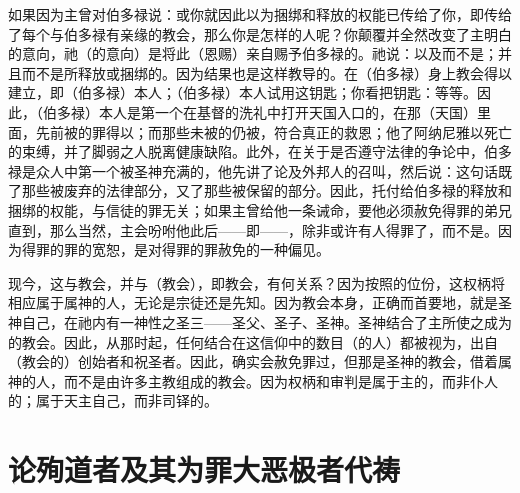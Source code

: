 如果因为主曾对伯多禄说：或你就因此以为捆绑和释放的权能已传给了你，即传给了每个与伯多禄有亲缘的教会，那么你是怎样的人呢？你颠覆并全然改变了主明白的意向，祂（的意向）是将此（恩赐）亲自赐予伯多禄的。祂说：以及而不是；并且而不是所释放或捆绑的。因为结果也是这样教导的。在（伯多禄）身上教会得以建立，即（伯多禄）本人；（伯多禄）本人试用这钥匙；你看把钥匙：等等。因此，（伯多禄）本人是第一个在基督的洗礼中打开天国入口的，在那（天国）里面，先前被的罪得以；而那些未被的仍被，符合真正的救恩；他了阿纳尼雅以死亡的束缚，并了脚弱之人脱离健康缺陷。此外，在关于是否遵守法律的争论中，伯多禄是众人中第一个被圣神充满的，他先讲了论及外邦人的召叫，然后说：这句话既了那些被废弃的法律部分，又了那些被保留的部分。因此，托付给伯多禄的释放和捆绑的权能，与信徒的罪无关；如果主曾给他一条诫命，要他必须赦免得罪的弟兄直到，那么当然，主会吩咐他此后——即——，除非或许有人得罪了，而不是。因为得罪的罪的宽恕，是对得罪的罪赦免的一种偏见。\par

现今，这与教会，并与（教会），即教会，有何关系？因为按照的位份，这权柄将相应属于属神的人，无论是宗徒还是先知。因为教会本身，正确而首要地，就是圣神自己，在祂内有一神性之圣三——圣父、圣子、圣神。圣神结合了主所使之成为的教会。因此，从那时起，任何结合在这信仰中的数目（的人）都被视为，出自（教会的）创始者和祝圣者。因此，确实会赦免罪过，但那是圣神的教会，借着属神的人，而不是由许多主教组成的教会。因为权柄和审判是属于主的，而非仆人的；属于天主自己，而非司铎的。\par


\section{论殉道者及其为罪大恶极者代祷}

